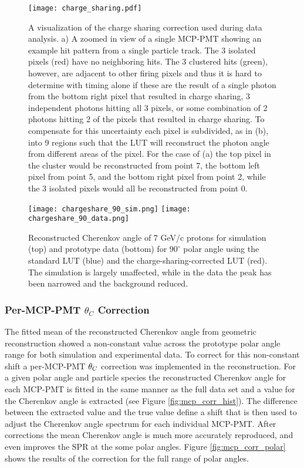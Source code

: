 \begin{figure}[!htb]
	\centering
	\texttt{[image: charge\_sharing.pdf]}
	\caption[A visualization of the charge sharing correction used during data analysis.]{A visualization of the charge sharing correction used during data analysis. a) A zoomed in view of a single MCP-PMT showing an example hit pattern from a single particle track. The 3 isolated pixels (red) have no neighboring hits. The 3 clustered hits (green), however, are adjacent to other firing pixels and thus it is hard to determine with timing alone if these are the result of a single photon from the bottom right pixel that resulted in charge sharing, 3 independent photons hitting all 3 pixels, or some combination of 2 photons hitting 2 of the pixels that resulted in charge sharing. To compensate for this uncertainty each pixel is subdivided, as in (b), into 9 regions such that the LUT will reconstruct the photon angle from different areas of the pixel. For the case of (a) the top pixel in the cluster would be reconstructed from point 7, the bottom left pixel from point 5, and the bottom right pixel from point 2, while the 3 isolated pixels would all be reconstructed from point 0.}
	\label{fig:charge_sharing}
\end{figure}

\begin{figure}[!htb]
	\centering
	\texttt{[image: chargeshare\_90\_sim.png]}
	\texttt{[image: chargeshare\_90\_data.png]}
	\caption[Reconstructed Cherenkov angle of 7 GeV/c protons for simulation (top) and prototype data (bottom) for $90^\circ$ polar angle using the standard LUT (blue) and the charge-sharing-corrected LUT (red).]{Reconstructed Cherenkov angle of 7 GeV/c protons for simulation (top) and prototype data (bottom) for $90^\circ$ polar angle using the standard LUT (blue) and the charge-sharing-corrected LUT (red). The simulation is largely unaffected, while in the data the peak has been narrowed and the background reduced.}
	\label{fig:charge_sharing_reco}
\end{figure}


\subsubsection{Per-MCP-PMT $\theta_{C}$ Correction}
The fitted mean of the reconstructed Cherenkov angle from geometric reconstruction showed a non-constant value across the prototype polar angle range for both simulation and experimental data. To correct for this non-constant shift a per-MCP-PMT $\theta_{C}$ correction was implemented in the reconstruction. For a given polar angle and particle species the reconstructed Cherenkov angle for each MCP-PMT is fitted in the same manner as the full data set and a value for the Cherenkov angle is extracted (see Figure \ref{fig:mcp_corr_hist}). The difference between the extracted value and the true value define a shift that is then used to adjust the Cherenkov angle spectrum for each individual MCP-PMT. After corrections the mean Cherenkov angle is much more accurately reproduced, and even improves the SPR at the some polar angles. Figure \ref{fig:mcp_corr_polar} shows the results of the correction for the full range of polar angles.

